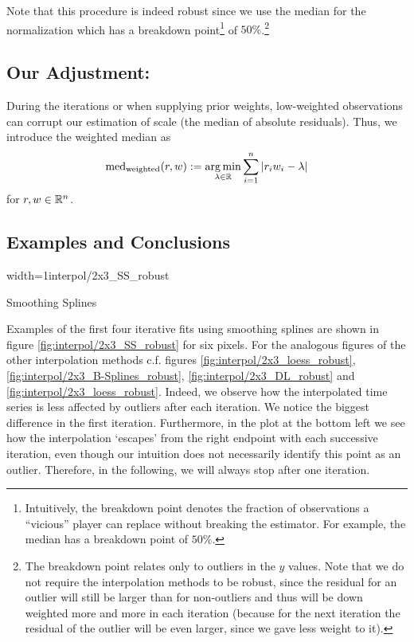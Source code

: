 {	Note that this procedure is indeed robust since we use the median for the normalization which has a breakdown point\footnote{Intuitively, the breakdown point denotes the fraction of observations a ``vicious'' player can replace without breaking the estimator. For example, the median has a breakdown point of $50 \%$.} of $50 \%$.\footnote{The breakdown point relates only to outliers in the $y$ values. Note that we do not require the interpolation methods to be robust, since the residual for an outlier will  still be larger than for non-outliers and thus will be down weighted more and more in each iteration (because for the next iteration the residual of the outlier will be even larger, since we gave less weight to it).}
	\subsection{Our Adjustment:}{
		During the iterations or when supplying prior weights, low-weighted observations can corrupt our estimation of scale (the median of absolute residuals). Thus, we introduce the weighted median as
		$$
			\operatorname{med}_\text{weighted}(r,w) := \operatorname*{arg\, min}_{\lambda \in \mathbb{R}} \sum_{i=1}^n |r_iw_i -\lambda|
		$$
		for $r,w\in \mathbb{R}^n$. 
	}
	\subsection{Examples and Conclusions}{
		\begin{my_figure}[h]{width=1\textwidth}{interpol/2x3_SS_robust}
			\caption{Smoothing Splines \RobItPlot}
			\label{fig:interpol/2x3_SS_robust}
		\end{my_figure}

		Examples of the first four iterative fits using smoothing splines are shown in figure \ref{fig:interpol/2x3_SS_robust} for six pixels. For the analogous figures of the other interpolation methods c.f. figures \ref{fig:interpol/2x3_loess_robust}, \ref{fig:interpol/2x3_B-Splines_robust}, \ref{fig:interpol/2x3_DL_robust} and \ref{fig:interpol/2x3_loess_robust}.
		Indeed, we observe how the interpolated time series is less affected by outliers after each iteration. We notice the biggest difference in the first iteration. Furthermore, in the plot at the bottom left we see how the interpolation `escapes' from the right endpoint with each successive iteration, even though our intuition does not necessarily identify this point as an outlier. Therefore, in the following, we will always stop after one iteration.
	} 
	
}
